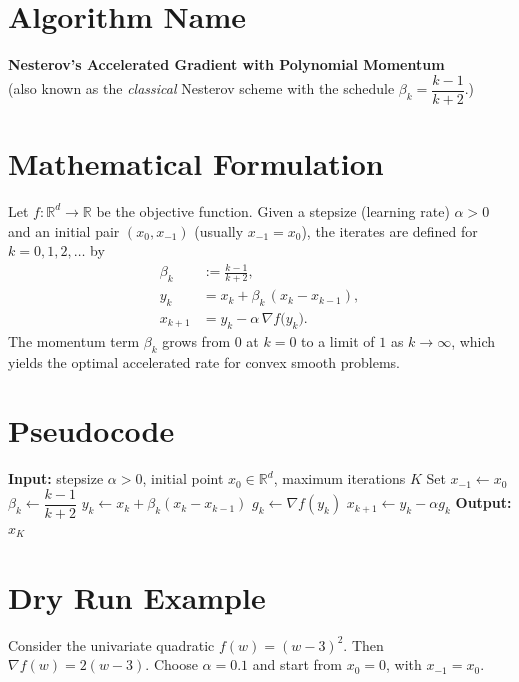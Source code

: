 \documentclass{article}
\newcommand{\grad}{\nabla}
\begin{document}
\section*{Algorithm Name}
\textbf{Nesterov’s Accelerated Gradient with Polynomial Momentum}\\
(also known as the \emph{classical} Nesterov scheme with the schedule
\(\beta_k=\dfrac{k-1}{k+2}\).)

\section*{Mathematical Formulation}
Let \(f:\mathbb{R}^d\rightarrow\mathbb{R}\) be the objective function.
Given a stepsize (learning rate) \(\alpha>0\) and an initial pair
\((x_{0},x_{-1})\) (usually \(x_{-1}=x_{0}\)), the iterates are defined for
\(k=0,1,2,\dots\) by
\[
\boxed{
\begin{aligned}
\beta_k &:= \frac{k-1}{k+2},\\[4pt]
y_k    &= x_k + \beta_k\,(x_k-x_{k-1}),\\[4pt]
x_{k+1}&= y_k - \alpha\,\grad f\bigl(y_k\bigr).
\end{aligned}}
\tag{1}
\]
The momentum term \(\beta_k\) grows from \(0\) at \(k=0\) to a limit of
\(1\) as \(k\to\infty\), which yields the optimal accelerated rate for
convex smooth problems.

\section*{Pseudocode}
\begin{algorithm}[H]
\caption{Accelerated Gradient (AG) with \(\beta_k=\frac{k-1}{k+2}\)}
\begin{algorithmic}[1]
\State \textbf{Input:} stepsize \(\alpha>0\), initial point \(x_0\in\mathbb{R}^d\), maximum iterations \(K\)
\State Set \(x_{-1}\gets x_0\)
    \State \(\beta_k \gets \dfrac{k-1}{k+2}\)      
    \State \(y_k \gets x_k + \beta_k (x_k-x_{k-1})\) 
    \State \(g_k \gets \grad f(y_k)\)                
    \State \(x_{k+1} \gets y_k - \alpha g_k\)        
\EndFor
\State \textbf{Output:} \(x_K\)
\end{algorithmic}
\end{algorithm}

\section*{Dry Run Example}
Consider the univariate quadratic
\(f(w)=(w-3)^2\).  Then \(\grad f(w)=2(w-3)\).  
Choose \(\alpha=0.1\) and start from \(x_0=0\), with \(x_{-1}=x_0\).
\end{document}
